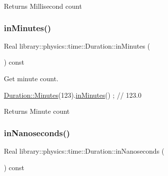 \begin{DoxyReturn}{Returns}
Millisecond count 
\end{DoxyReturn}
\mbox{\label{classlibrary_1_1physics_1_1time_1_1_duration_aef580516014096d1e5ae5bb6ae8e6f29}} 
\subsubsection{\texorpdfstring{in\+Minutes()}{inMinutes()}}
{\footnotesize\ttfamily Real library\+::physics\+::time\+::\+Duration\+::in\+Minutes (\begin{DoxyParamCaption}{ }\end{DoxyParamCaption}) const}



Get minute count. 


\begin{DoxyCode}
\hyperlink{classlibrary_1_1physics_1_1time_1_1_duration_ad7171befa3075e796bfb02a7542dacdd}{Duration::Minutes}(123).\hyperlink{classlibrary_1_1physics_1_1time_1_1_duration_aef580516014096d1e5ae5bb6ae8e6f29}{inMinutes}() ; \textcolor{comment}{// 123.0}
\end{DoxyCode}


\begin{DoxyReturn}{Returns}
Minute count 
\end{DoxyReturn}
\mbox{\label{classlibrary_1_1physics_1_1time_1_1_duration_a45aa358d61481356dd591290d6ab3691}} 
\subsubsection{\texorpdfstring{in\+Nanoseconds()}{inNanoseconds()}}
{\footnotesize\ttfamily Real library\+::physics\+::time\+::\+Duration\+::in\+Nanoseconds (\begin{DoxyParamCaption}{ }\end{DoxyParamCaption}) const}



